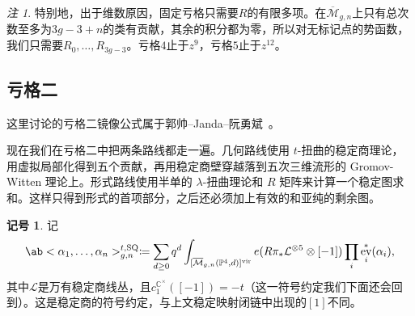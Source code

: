 \documentclass{amsart}
\theoremstyle{definition}
\newtheorem{notn}[thm]{记号}
\theoremstyle{remark}
\newtheorem{rmk}[thm]{注}
\theoremstyle{plain}
\theoremstyle{definition}
\theoremstyle{remark}
\newcommand{\C}{\mathbb{C}}
\renewcommand{\P}{\mathbb{P}}
\newcommand{\Mbar}{\overline{\mathcal{M}}}
\newcommand{\mc}[1]{\mathcal{#1}}
\newcommand{\mr}[1]{\mathrm{#1}}
\newcommand{\1}{\mathbf{1}}
\newcommand{\2}{\mathbf{2}}
\newcommand{\3}{\mathbf{3}}
\newcommand{\vir}{\mr{vir}}
\DeclareMathOperator{\ev}{ev}
\begin{document}
\begin{rmk}
    特别地，出于维数原因，固定亏格只需要\(R\)的有限多项。在\(\Mbar_{g,n}\)上只有总次数至多为\(3g-3+n\)的类有贡献，其余的积分都为零，所以对无标记点的势函数，我们只需要\(R_0, \ldots, R_{3g-3}\)。亏格\(4\)止于\(z^9\)，亏格\(5\)止于\(z^{12}\)。
\end{rmk}

\subsection{亏格二}%
\label{sub:Genus two}

这里讨论的亏格二镜像公式属于郭帅--Janda--阮勇斌~\cite{GJRgenus2}。

现在我们在亏格二中把两条路线都走一遍。几何路线使用 \(t\)-扭曲的稳定商理论，用虚拟局部化得到五个贡献，再用稳定商壁穿越落到五次三维流形的 Gromov-Witten 理论上。形式路线使用半单的 \(\lambda\)-扭曲理论和 \(R\) 矩阵来计算一个稳定图求和。这样只得到形式的首项部分，之后还必须加上有效的和亚纯的剩余图。

\begin{notn}
    记
    \[ \ab<\alpha_1, \ldots, \alpha_n>^{t,\mr{SQ}}_{g,n} \coloneqq \sum_{d\geq0}q^d \int_{[\Mbar_{g,n}(\P^4,d)]^{\vir}}e(R\pi_*\mc{L}^{\otimes 5}\otimes[-1])\prod_i \ev_i^*(\alpha_i), \]
    其中\(\mc{L}\)是万有稳定商线丛，且\(c_1^{\C^{\times}}([-1]) = -t\)（这一符号约定我们下面还会回到）。这是稳定商的符号约定，与上文稳定映射闭链中出现的\([1]\)不同。
\end{notn}
\end{document}
